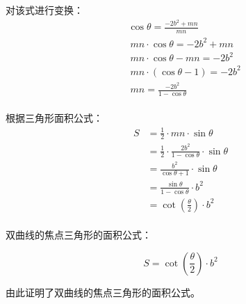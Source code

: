 \documentclass[UTF8]{ctexart}
\begin{document}
\newpage

    对该式进行变换：
    \begin{align}
        &\cos{\theta}=\frac{-2b^2+mn}{mn}\\[5mm]
        &~mn\cdot\cos{\theta}=-2b^2+mn\\[5mm]
        &~mn\cdot\cos{\theta}-mn=-2b^2\\[5mm]
        &~mn\cdot(\cos{\theta}-1)=-2b^2\\[5mm]
        &~mn=\frac{-2b^2}{1-\cos{\theta}}
    \end{align}\\
    根据三角形面积公式：
    \begin{align}
        S&=\frac{1}{2}\cdot mn\cdot\sin{\theta}\\[5mm]
        &=\frac{1}{2}\cdot \frac{2b^2}{1-\cos{\theta}}\cdot\sin{\theta}\\[5mm]
        &=\frac{b^2}{\cos{\theta}+1}\cdot\sin{\theta}\\[5mm]
        &=\frac{\sin{\theta}}{1-\cos{\theta}}\cdot b^2\\[5mm]
        &=\cot{\left(\frac{\theta}{2}\right)}\cdot b^2
    \end{align}\\
    双曲线的焦点三角形的面积公式：
    \begin{large}
        \begin{equation*}
            S=\cot{\left(\frac{\theta}{2}\right)}\cdot b^2
        \end{equation*}
    \end{large}
    由此证明了双曲线的焦点三角形的面积公式。

\newpage
\end{document}
